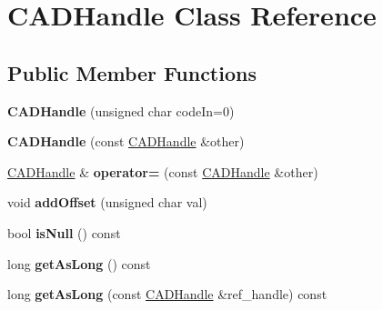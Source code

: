 \hypertarget{class_c_a_d_handle}{}\section{C\+A\+D\+Handle Class Reference}
\label{class_c_a_d_handle}
\subsection*{Public Member Functions}
\begin{DoxyCompactItemize}
\item 
{\bfseries C\+A\+D\+Handle} (unsigned char code\+In=0)\hypertarget{class_c_a_d_handle_a2424aa7d4d11c24b3226f96d80fbb401}{}\label{class_c_a_d_handle_a2424aa7d4d11c24b3226f96d80fbb401}

\item 
{\bfseries C\+A\+D\+Handle} (const \hyperlink{class_c_a_d_handle}{C\+A\+D\+Handle} \&other)\hypertarget{class_c_a_d_handle_a60fb09aa441674c631b51d09cb858e01}{}\label{class_c_a_d_handle_a60fb09aa441674c631b51d09cb858e01}

\item 
\hyperlink{class_c_a_d_handle}{C\+A\+D\+Handle} \& {\bfseries operator=} (const \hyperlink{class_c_a_d_handle}{C\+A\+D\+Handle} \&other)\hypertarget{class_c_a_d_handle_ab70cf076a65b1f3d29e1d2410422dd12}{}\label{class_c_a_d_handle_ab70cf076a65b1f3d29e1d2410422dd12}

\item 
void {\bfseries add\+Offset} (unsigned char val)\hypertarget{class_c_a_d_handle_af5e7a2a57b6fd75da2cf5dae3a6e6e62}{}\label{class_c_a_d_handle_af5e7a2a57b6fd75da2cf5dae3a6e6e62}

\item 
bool {\bfseries is\+Null} () const \hypertarget{class_c_a_d_handle_aef7cb1ebb89c9542326f031078a05cf2}{}\label{class_c_a_d_handle_aef7cb1ebb89c9542326f031078a05cf2}

\item 
long {\bfseries get\+As\+Long} () const \hypertarget{class_c_a_d_handle_ad520f166b8f666deab857ea3a53d4c58}{}\label{class_c_a_d_handle_ad520f166b8f666deab857ea3a53d4c58}

\item 
long {\bfseries get\+As\+Long} (const \hyperlink{class_c_a_d_handle}{C\+A\+D\+Handle} \&ref\+\_\+handle) const \hypertarget{class_c_a_d_handle_a953b7872ab5082b8c76a04ad53836bc5}{}\label{class_c_a_d_handle_a953b7872ab5082b8c76a04ad53836bc5}

\end{DoxyCompactItemize}
